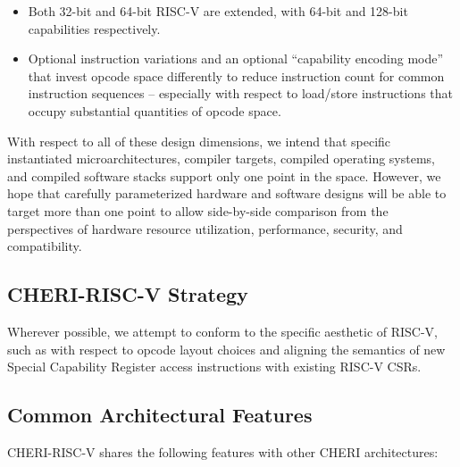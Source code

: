 \begin{itemize}
\item Both 32-bit and 64-bit RISC-V are extended, with 64-bit and 128-bit
  capabilities respectively.

%

\item Optional instruction variations and an optional ``capability encoding
  mode'' that
  invest opcode space differently to reduce instruction count for common
  instruction sequences -- especially with respect to load/store instructions
  that occupy substantial quantities of opcode space.
\end{itemize}

With respect to all of these design dimensions, we intend that specific
instantiated microarchitectures, compiler targets, compiled operating systems,
and compiled software stacks support only one point in the space.
However, we hope that carefully parameterized hardware and software designs
will be able to target more than one point to allow side-by-side comparison
from the perspectives of hardware resource utilization, performance, security,
and compatibility.

\subsection{CHERI-RISC-V Strategy}

Wherever possible, we attempt to conform to the specific aesthetic of RISC-V,
such as with respect to opcode layout choices and aligning the semantics of
new Special Capability Register access instructions with existing RISC-V CSRs.


\subsection{Common Architectural Features}

CHERI-RISC-V shares the following features with other CHERI architectures:


